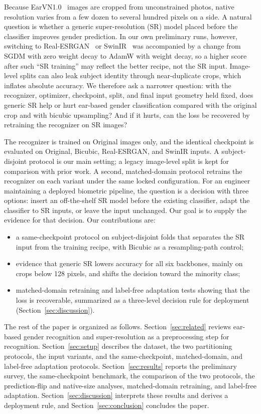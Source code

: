 \documentclass[conference]{IEEEtran}
\begin{document}
Because EarVN1.0~\cite{hoang2019earvn} images are cropped from unconstrained photos, native resolution varies from a few dozen to several hundred pixels on a side. A natural question is whether a generic super-resolution (SR) model placed before the classifier improves gender prediction. In our own preliminary runs, however, switching to Real-ESRGAN~\cite{realesrgan} or SwinIR~\cite{swinir} was accompanied by a change from SGDM with zero weight decay to AdamW with weight decay, so a higher score after such ``SR training'' may reflect the better recipe, not the SR input. Image-level splits can also leak subject identity through near-duplicate crops, which inflates absolute accuracy. We therefore ask a narrower question: with the recognizer, optimizer, checkpoint, split, and final input geometry held fixed, does generic SR help or hurt ear-based gender classification compared with the original crop and with bicubic upsampling? And if it hurts, can the loss be recovered by retraining the recognizer on SR images?

The recognizer is trained on Original images only, and the identical checkpoint is evaluated on Original, Bicubic, Real-ESRGAN, and SwinIR inputs. A subject-disjoint protocol is our main setting; a legacy image-level split is kept for comparison with prior work. A second, matched-domain protocol retrains the recognizer on each variant under the same locked configuration. For an engineer maintaining a deployed biometric pipeline, the question is a decision with three options: insert an off-the-shelf SR model before the existing classifier, adapt the classifier to SR inputs, or leave the input unchanged. Our goal is to supply the evidence for that decision. Our contributions are:
\begin{itemize}
\item a same-checkpoint protocol on subject-disjoint folds that separates the SR input from the training recipe, with Bicubic as a resampling-path control;
\item evidence that generic SR lowers accuracy for all six backbones, mainly on crops below 128 pixels, and shifts the decision toward the minority class;
\item matched-domain retraining and label-free adaptation tests showing that the loss is recoverable, summarized as a three-level decision rule for deployment (Section~\ref{sec:discussion}).
\end{itemize}
The rest of the paper is organized as follows. Section~\ref{sec:related} reviews ear-based gender recognition and super-resolution as a preprocessing step for recognition. Section~\ref{sec:setup} describes the dataset, the two partitioning protocols, the input variants, and the same-checkpoint, matched-domain, and label-free adaptation protocols. Section~\ref{sec:results} reports the preliminary survey, the same-checkpoint benchmark, the comparison of the two protocols, the prediction-flip and native-size analyses, matched-domain retraining, and label-free adaptation. Section~\ref{sec:discussion} interprets these results and derives a deployment rule, and Section~\ref{sec:conclusion} concludes the paper.
\end{document}

